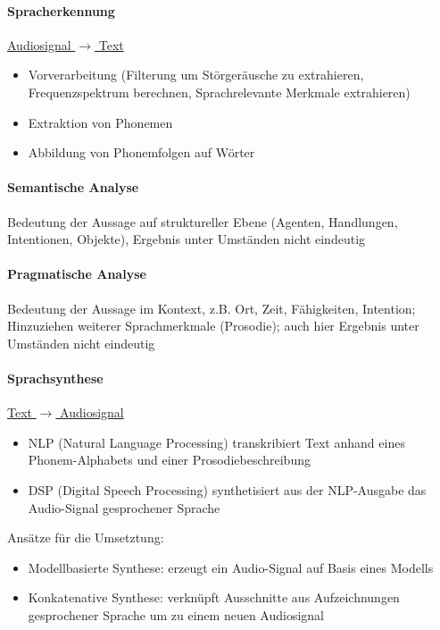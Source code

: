 \documentclass
[
	8pt,		%
	ngerman,	%
	a4paper,	%
	landscape,	%
	final		%
]{extarticle}
\begin{document}
\begin{multicols*}{4}
	\paragraph{Spracherkennung} \underline{Audiosignal \(\rightarrow\) Text}
	\begin{itemize}
		\item Vorverarbeitung (Filterung um Störgeräusche zu extrahieren,
		      Frequenzspektrum berechnen, Sprachrelevante Merkmale extrahieren)
		\item Extraktion von Phonemen
		\item Abbildung von Phonemfolgen auf Wörter
	\end{itemize}
	\paragraph{Semantische Analyse} Bedeutung der Aussage auf struktureller
	Ebene (Agenten, Handlungen, Intentionen, Objekte), Ergebnis unter Umständen
	nicht eindeutig
	\paragraph{Pragmatische Analyse} Bedeutung der Aussage im Kontext, z.B. Ort,
	Zeit, Fähigkeiten, Intention; Hinzuziehen weiterer Sprachmerkmale (Prosodie);
	auch hier Ergebnis unter Umständen nicht eindeutig
	\paragraph{Sprachsynthese} \underline{Text \(\rightarrow\) Audiosignal}
	\begin{itemize}
		\item NLP (Natural Language Processing) transkribiert Text anhand eines
		      Phonem-Alphabets und einer Prosodiebeschreibung
		\item DSP (Digital Speech Processing) synthetisiert aus der NLP-Ausgabe
		      das Audio-Signal gesprochener Sprache
	\end{itemize}
	Ansätze für die Umsetztung:
	\begin{itemize}
		\item Modellbasierte Synthese: erzeugt ein Audio-Signal auf Basis eines
		      Modells
		\item Konkatenative Synthese: verknüpft Ausschnitte aus Aufzeichnungen
		      gesprochener Sprache um zu einem neuen Audiosignal
	\end{itemize}

\end{multicols*}
\end{document}
